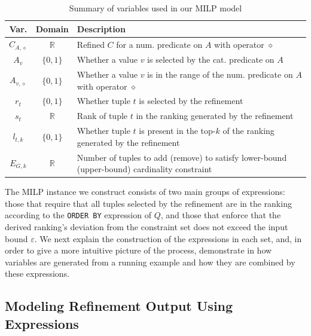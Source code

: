 \begin{table}[t!]
    \centering
    \caption{Summary of variables used in our MILP model}
    \footnotesize
    \begin{tabularx}{0.7\textwidth}{ccX}
    \hline
    {\bf Var.} & {\bf Domain} & {\bf Description} \\
    \hline
    $C_{A,\diamond}$  & $\mathbb{R}$ & Refined $C$ for a num. predicate on $A$ with operator $\diamond$                     \\
    $A_v$             & $\{0, 1\}$ & Whether a value $v$ is selected by the cat. predicate on $A$                           \\
    $A_{v, \diamond}$ & $\{0, 1\}$ &  Whether a value $v$ is in the range of the num. predicate on $A$ with operator $\diamond$ \\
    $r_t$            & $\{0, 1\}$ & Whether tuple $t$ is selected by the refinement                                     \\
    $s_{t}$          & $\mathbb{R}$ & Rank of tuple $t$ in the ranking generated by the refinement                              \\
    $l_{t, k}$       & $\{0, 1\}$ & Whether tuple $t$ is present in the top-$k$ of the ranking generated by the refinement          \\
    $E_{G, k}$       & $\mathbb{R}$ & Number of tuples to add (remove) to satisfy lower-bound (upper-bound) cardinality constraint    \\
    \hline
    \end{tabularx}
    \label{tab:variables}
\end{table}

The MILP instance we construct consists of two main groups of expressions: those that require that all tuples selected by the refinement are in the ranking according to the {\tt ORDER BY} expression of $Q$, and those that enforce that the derived ranking's deviation from the constraint set does not exceed the input bound $\varepsilon$. We next explain the construction of the expressions in each set, and, in order to give a more intuitive picture of the process, demonstrate in  how variables are generated from a running example and how they are combined by these expressions.


\subsection{Modeling Refinement Output Using Expressions}

